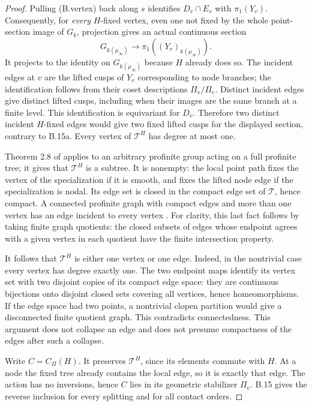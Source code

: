 \begin{proof}
Pulling (B.vertex) back along $s$ identifies
$D_v\cap E_s$ with $\pi_1(Y_v)$. Consequently, for \emph{every}
$H$-fixed vertex, even one not fixed by the whole point-section image of
$G_k$, projection gives an actual continuous section
\[
 G_{k(\mu_\infty)}\longrightarrow
 \pi_1((Y_v)_{k(\mu_\infty)}).
\]
It projects to the identity on $G_{k(\mu_\infty)}$ because $H$ already
does so. The incident edges at $v$ are the lifted cusps of $Y_v$
corresponding to node branches; the identification follows from their
coset descriptions $\Pi_v/\Pi_e$. Distinct incident edges give distinct
lifted cusps, including when their images are the same branch at a finite
level. This identification is equivariant for $D_v$. Therefore two
distinct incident $H$-fixed edges would give two fixed lifted cusps for
the displayed section, contrary to B.15a. Every vertex of
$\mathcal T^H$ has degree at most one.

Theorem 2.8 of \citet[pp.~413--414]{BC_ZM1989} applies to an arbitrary
profinite group acting on a full profinite tree; it gives that
$\mathcal T^H$ is a subtree. It is nonempty: the local point path fixes
the vertex of the specialization if it is smooth, and fixes the lifted
node edge if the specialization is nodal. Its edge set is closed in the
compact edge set of $\mathcal T$, hence compact. A connected profinite
graph with compact edges and more than one vertex has an edge incident to
every vertex \citep[Lemma 2.14, p.~417]{BC_ZM1989}.
For clarity, this last fact follows by taking finite graph quotients:
the closed subsets of edges whose endpoint agrees with a given vertex
in each quotient have the finite intersection property.

It follows that $\mathcal T^H$ is either one vertex or one edge. Indeed,
in the nontrivial case every vertex has degree exactly one. The two endpoint
maps identify its vertex set with two disjoint copies of its compact edge
space: they are continuous bijections onto disjoint closed sets covering
all vertices, hence homeomorphisms. If the edge space had two points,
a nontrivial clopen partition would give a disconnected finite quotient
graph. This contradicts connectedness. This argument does not collapse
an edge and does not presume compactness of the edges after such a collapse.

Write $C=C_\Pi(H)$. It preserves $\mathcal T^H$, since its elements
commute with $H$. At a node the fixed tree already contains the local
edge, so it is exactly that edge. The action has no inversions, hence
$C$ lies in its geometric stabilizer $\Pi_e$. B.15 gives the reverse
inclusion for every splitting and for all contact orders.


\end{proof}
